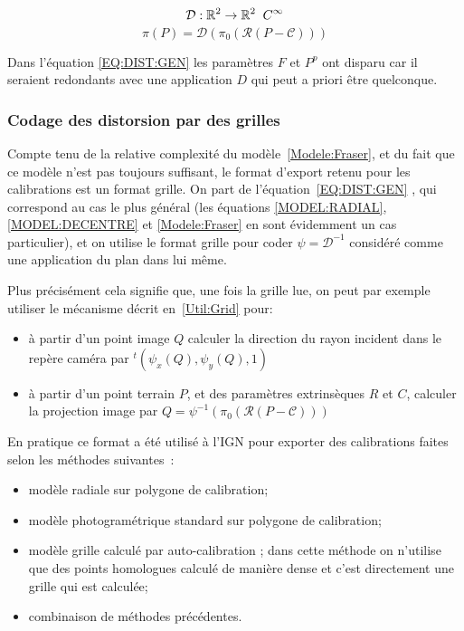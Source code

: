 \begin{equation}
   \mathcal{D} : \RR^2 \rightarrow \RR^2 \; \; C^\infty
\end{equation}
\begin{equation}
   \pi(P) =   \mathcal{D}(\pi_0(\mathcal{R}(P-\mathcal{C})))
   \label{EQ:DIST:GEN}
\end{equation}

Dans l'\'equation \ref{EQ:DIST:GEN} les param\`etres  $F$ et $P^p$ ont
disparu car il seraient redondants avec une application $D$  qui peut
a priori \^etre quelconque.


\subsubsection{Codage des distorsion par des grilles}

Compte tenu de la relative complexit\'e du mod\`ele~\ref{Modele:Fraser},
et du fait que ce mod\`ele  n'est pas toujours suffisant, le format
d'export retenu pour les calibrations  est un format grille.
On part de  l'\'equation~\ref{EQ:DIST:GEN}  , qui correspond
au cas le plus g\'en\'eral (les \'equations 
\ref{MODEL:RADIAL}, \ref{MODEL:DECENTRE} et \ref{Modele:Fraser}
en sont \'evidemment un cas particulier), et on  utilise
le format grille pour coder $\psi=\mathcal{D}^{-1}$  consid\'er\'e
comme une application du plan dans lui m\^eme.

Plus pr\'ecis\'ement cela signifie que, une fois la grille lue,
on peut par exemple utiliser le m\'ecanisme d\'ecrit 
en~\ref{Util:Grid} pour:

\begin{itemize}
   \item \`a partir d'un point image $Q$ calculer la direction
         du rayon incident dans le rep\`ere cam\'era par 
         $^t(\psi_x(Q),\psi_y(Q),1)$

   \item  \`a partir d'un point terrain $P$, et des param\`etres 
          extrins\`eques $R$ et $C$, calculer la projection image par
          $Q= \psi^{-1}(\pi_0(\mathcal{R}(P-\mathcal{C})))$

\end{itemize}

En pratique ce format a \'et\'e utilis\'e \`a l'IGN pour exporter des calibrations 
faites selon les m\'ethodes suivantes~:

\begin{itemize}
   \item  mod\`ele radiale sur polygone de calibration;

   \item  mod\`ele photogram\'etrique standard sur polygone de calibration;

   \item  mod\`ele grille  calcul\'e par auto-calibration ; dans cette m\'ethode
          on n'utilise que  des points homologues calcul\'e de mani\`ere dense
          et c'est directement une grille qui est calcul\'ee;

   \item  combinaison de m\'ethodes pr\'ec\'edentes.

\end{itemize}


